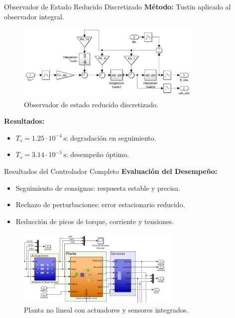 \documentclass[12pt]{beamer}
\begin{document}
\begin{frame}{Observador de Estado Reducido Discretizado}
\textbf{Método:} Tustin aplicado al observador integral.

\begin{figure}[h]
    \centering
    \includegraphics[width=0.8\textwidth]{Imagenes/Observador_PID_discreto.png}
    \caption{Observador de estado reducido discretizado.}
    \label{fig:observador_estado_discreto}
\end{figure}

\textbf{Resultados:}
\begin{itemize}
    \item \( T_s = 1.25 \cdot 10^{-4} \, \text{s} \): degradación en seguimiento.
    \item \( T_s = 3.14 \cdot 10^{-5} \, \text{s} \): desempeño óptimo.
\end{itemize}
\end{frame}

\begin{frame}{Resultados del Controlador Completo}
\textbf{Evaluación del Desempeño:}
\begin{itemize}
    \item Seguimiento de consignas: respuesta estable y precisa.
    \item Rechazo de perturbaciones: error estacionario reducido.
    \item Reducción de picos de torque, corriente y tensiones.
\end{itemize}

\begin{figure}[h]
    \centering
    \includegraphics[width=0.7\textwidth]{Imagenes/Planta_Actuadores_Sensores_Final.png}
    \caption{Planta no lineal con actuadores y sensores integrados.}
    \label{fig:Planta_Actuadores_Sensores_Final}
\end{figure}
\end{frame}
\end{document}

